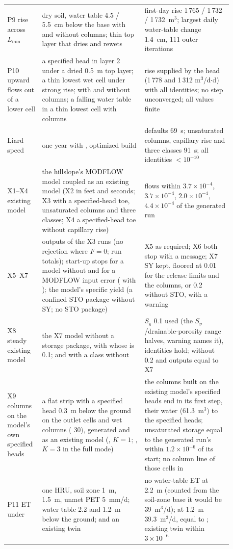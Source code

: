 \begin{longtable}{P{0.13\linewidth}P{0.42\linewidth}P{0.36\linewidth}}
P9 rise across $L_{\min}$ & dry soil, water table 4.5 / 5.5~cm below the base with and without columns; thin top layer that dries and rewets & first-day rise 1\,765 / 1\,732 / 1\,732~m$^3$; largest daily water-table change 1.4~cm, 111 outer iterations\\
P10 upward flows out of a lower cell & a specified head in layer 2 under a dried 0.5~m top layer; a thin lowest wet cell under strong rise; with and without columns; a falling water table in a thin lowest cell with columns & rise supplied by the head (1\,778 and 1\,312 m$^3$/d$\cdot$d) with all identities; no step unconverged; all values finite\\
Liard speed & one year with , optimized build & defaults 69~s; unsaturated columns, capillary rise and three classes 91~s; all identities $<10^{-10}$\\
X1--X4 existing model & the hillslope's MODFLOW model coupled as an existing model (X2 in feet and seconds; X3 with a specified-head toe, unsaturated columns and three classes; X4 a specified-head toe without capillary rise) & flows within $3.7\times10^{-4}$, $3.7\times10^{-4}$, $2.0\times10^{-4}$, $4.4\times10^{-4}$ of the generated run\\
X5--X7 & outputs of the X3 runs (no rejection where $F=0$; run totals); start-up stops for a model without  and for a MODFLOW input error ( with ); the model's specific yield (a confined STO package without SY; no STO package) & X5 as required; X6 both stop with a message; X7 SY kept, floored at 0.01 for the release limits and the columns, or 0.2 without STO, with a warning\\
X8 steady existing model & the X7 model without a storage package, with  whose  is 0.1; and with a class without  & $S_y$ 0.1 used (the $S_y$/drainable-porosity range halves, warning names it), identities hold; without  0.2 and outputs equal to X7\\
X9 columns on the model's own specified heads & a flat strip with a specified head 0.3~m below the ground on the outlet cells and wet columns ( 30), generated and as an existing model (, $K=1$; , $K=3$ in the full mode) & the columns built on the existing model's specified heads end in its first step, their water (61.3~m$^3$) to the specified heads; unsaturated storage equal to the generated run's within $1.2\times10^{-6}$ of its start; no column line of those cells in \\
P11 ET under  & one HRU, soil zone 1~m,  1.5~m, unmet PET 5~mm/d; water table 2.2 and 1.2~m below the ground;  and an existing twin & no water-table ET at 2.2~m (counted from the soil-zone base it would be 39~m$^3$/d); at 1.2~m 39.3~m$^3$/d, equal to ; existing twin within $3\times10^{-6}$\\\bottomrule
\end{longtable}

